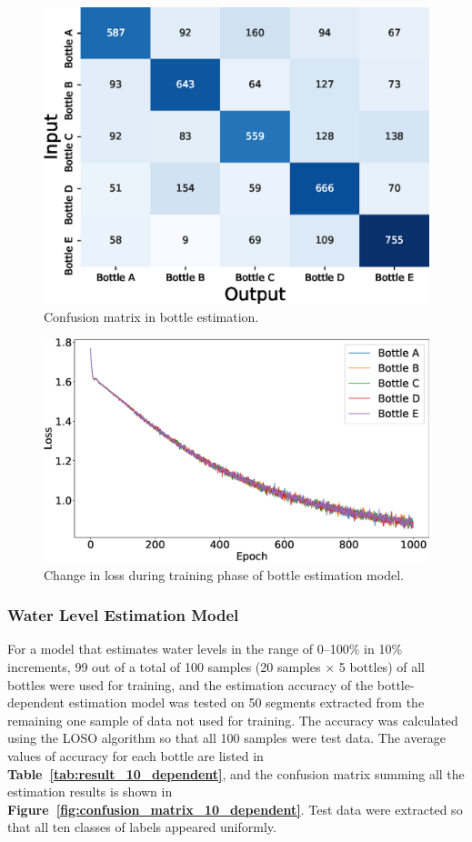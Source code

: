 \documentclass[sigconf]{acmart}
\newcommand\figref[1]{\textbf{Figure~\ref{fig:#1}}}
\newcommand\tabref[1]{\textbf{Table~\ref{tab:#1}}}
\begin{document}
\begin{figure}[!t]
  \centering
  \includegraphics[width=1\linewidth]{figures/confusion_matrix_5.eps}
  \caption{Confusion matrix in bottle estimation.}
  \label{fig:confusion_matrix_5}
\end{figure}

\begin{figure}[!t]
  \centering
  \includegraphics[width=1\linewidth]{figures/loss_5.eps}
  \caption{Change in loss during training phase of bottle estimation model.}
  \label{fig:loss}
\end{figure}

\subsubsection{Water Level Estimation Model}
For a model that estimates water levels in the range of 0--100\% in 10\% increments, 99 out of a total of 100 samples (20 samples $\times$ 5 bottles) of all bottles were used for training, and the estimation accuracy of the bottle-dependent estimation model was tested on 50 segments extracted from the remaining one sample of data not used for training. The accuracy was calculated using the LOSO algorithm so that all 100 samples were test data. The average values of accuracy for each bottle are listed in \tabref{result_10_dependent}, and the confusion matrix summing all the estimation results is shown in \figref{confusion_matrix_10_dependent}. Test data were extracted so that all ten classes of labels appeared uniformly.\par
\end{document}
